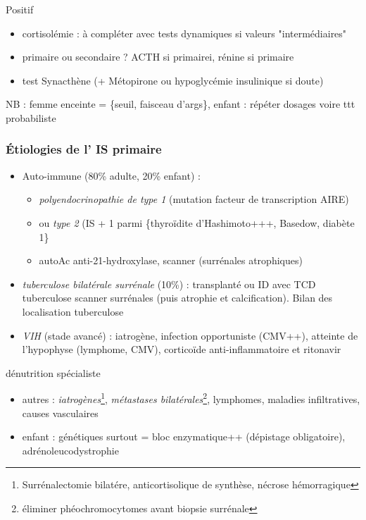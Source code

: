 \documentclass[11pt]{article}
\begin{document}
Positif 
\begin{itemize}
\item cortisolémie : à compléter avec tests dynamiques si valeurs "intermédiaires"
\item primaire ou secondaire ? ACTH \inc{} si primairei, rénine \inc si primaire
\item test Synacthène (+ Métopirone ou hypoglycémie insulinique si doute)
\end{itemize}

NB : femme enceinte = \{\inc seuil, faisceau d'args\}, enfant : répéter dosages
voire ttt probabiliste

\subsubsection{Étiologies de l' \acrshort{IS} primaire}
\label{sec:org9bbe379}
\begin{itemize}
\item Auto-immune (80\% adulte, 20\% enfant) : 
\begin{itemize}
\item \emph{polyendocrinopathie de type 1} (mutation facteur de transcription AIRE)
\item ou \emph{type 2} (IS + 1 parmi \{thyroïdite d'Hashimoto+++, Basedow, diabète 1\}
\item \thus autoAc anti-21-hydroxylase, scanner (surrénales atrophiques)
\end{itemize}
\item \emph{tuberculose bilatérale surrénale} (10\%) : transplanté ou ID avec TCD tuberculose
\thus scanner surrénales (\inc puis atrophie et calcification). Bilan des
localisation tuberculose
\item \emph{VIH} (stade avancé) : iatrogène, infection opportuniste (CMV++), atteinte de
l'hypophyse (lymphome, CMV), corticoïde anti-inflammatoire et ritonavir
\end{itemize}
\danger dénutrition \thus spécialiste
\begin{itemize}
\item autres : \emph{iatrogènes}\footnote{Surrénalectomie bilatére, anticortisolique de synthèse, nécrose hémorragique}, \emph{métastases bilatérales}\footnote{\danger éliminer phéochromocytomes avant biopsie surrénale}, lymphomes, maladies
infiltratives, causes vasculaires
\item enfant : génétiques surtout = bloc enzymatique++ (dépistage obligatoire), adrénoleucodystrophie
\end{itemize}
\end{document}
